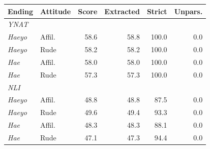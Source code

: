 \begin{tabular}{llrrrr}
\toprule
Ending & Attitude & Score & Extracted & Strict & Unpars. \\
\midrule
\multicolumn{6}{l}{\textit{YNAT}} \\
\textit{Haeyo} & Affil. & 58.6 & 58.8 & 100.0 & 0.0 \\
\textit{Haeyo} & Rude & 58.2 & 58.2 & 100.0 & 0.0 \\
\textit{Hae} & Affil. & 58.0 & 58.0 & 100.0 & 0.0 \\
\textit{Hae} & Rude & 57.3 & 57.3 & 100.0 & 0.0 \\
\multicolumn{6}{l}{\textit{NLI}} \\
\textit{Haeyo} & Affil. & 48.8 & 48.8 & 87.5 & 0.0 \\
\textit{Haeyo} & Rude & 49.6 & 49.4 & 93.3 & 0.0 \\
\textit{Hae} & Affil. & 48.3 & 48.3 & 88.1 & 0.0 \\
\textit{Hae} & Rude & 47.1 & 47.3 & 94.4 & 0.0 \\
\bottomrule
\end{tabular}
